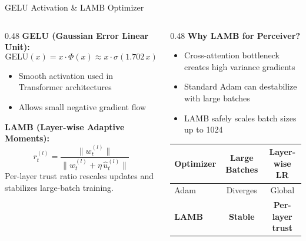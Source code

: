 \documentclass[aspectratio=169,11pt]{beamer}
\begin{document}
\begin{frame}[shrink=5]{GELU Activation \& LAMB Optimizer}
  \begin{columns}[T,onlytextwidth]
    \begin{column}{0.48\textwidth}
      \small
      \textbf{GELU (Gaussian Error Linear Unit):}
      \[
      \text{GELU}(x) = x \cdot \Phi(x) \approx x \cdot \sigma(1.702\,x)
      \]
      \vspace{-0.25em}
      \begin{itemize}
        \item Smooth activation used in Transformer architectures
        \item Allows small negative gradient flow
      \end{itemize}

      \vspace{0.2em}
      \textbf{LAMB (Layer-wise Adaptive Moments):}
      \vspace{-0.25em}
      \[
      r_t^{(l)} = \frac{\|w_t^{(l)}\|}{\|w_t^{(l)} + \eta\, \hat{u}_t^{(l)}\|}
      \]
      \vspace{-0.55em}
      {\footnotesize Per-layer trust ratio rescales updates and stabilizes large-batch training.}
    \end{column}
    \begin{column}{0.48\textwidth}
      \small
      \textbf{Why LAMB for Perceiver?}
      \begin{itemize}
        \item Cross-attention bottleneck creates high variance gradients
        \item Standard Adam can \alert{destabilize} with large batches
        \item LAMB safely scales batch sizes up to 1024
      \end{itemize}

      \vspace{0.25em}
      \begin{table}
        \centering\scriptsize
        \begin{tabular}{lcc}
          \toprule
          \textbf{Optimizer} & \textbf{Large Batches} & \textbf{Layer-wise LR} \\
          \midrule
          Adam & Diverges & Global \\
          \textbf{LAMB} & \textbf{Stable} & \textbf{Per-layer trust} \\
          \bottomrule
        \end{tabular}
      \end{table}
    \end{column}
  \end{columns}
\end{frame}
\end{document}
